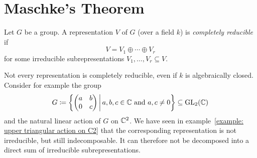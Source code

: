 \section{Maschke’s Theorem}


\begin{definition}
  Let $G$ be a group.
  A representation $V$ of $G$ (over a field $k$) is \emph{completely reducible} if
  \[
      V
    = V_1 \oplus \dotsb \oplus V_r
  \]
  for some irreducible subrepresentations $V_1, \dotsc, V_r \subseteq V$.
\end{definition}


\begin{remark}
  Not every representation is completely reducible, even if $k$ is algebraically closed.
  Consider for example the group
  \[
    G
    \defined \left\{
                \begin{pmatrix}
                  a & b \\
                  0 & c
                \end{pmatrix}
              \suchthat*
                \text{$a, b, c \in \Complex$ and $a,c \neq 0$}
              \right\}
    \subseteq \GL_2(\Complex)
  \]
  and the natural linear action of $G$ on $\mathbb{C}^2$.
  We have seen in example~\ref{example: upper triangular action on C2} that the corresponding representation is not irreducible, but still indecomposable.
  It can therefore not be decomposed into a direct sum of irreducible subrepresentations.
\end{remark}



